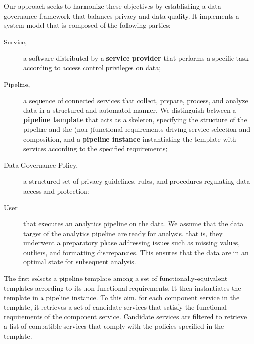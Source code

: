 Our approach seeks to harmonize these objectives by establishing a data governance framework that balances privacy and data quality. It implements a system model that is composed of the following parties:
\begin{description}
  \item[Service,] a software distributed by a \textbf{service provider} that performs a specific task according to access control privileges on data; %
  \item[Pipeline,] a sequence of connected services that collect, prepare, process, and analyze data in a structured and automated manner. We distinguish between a \textbf{pipeline template} that acts as a skeleton, specifying the structure of the pipeline and the (non-)functional requirements driving service selection and composition, and a \textbf{pipeline instance} instantiating the template with services according to the specified requirements;
  \item[Data Governance Policy,] a structured set of privacy guidelines, rules, and procedures regulating data access and protection;
  \item[User] that executes an analytics pipeline on the data. We assume that the data target of the analytics pipeline are ready for analysis, that is, they underwent a preparatory phase addressing issues such as missing values, outliers, and formatting discrepancies. This ensures that the data are in an optimal state for subsequent analysis.
\end{description}

The \user first selects a pipeline template among a set of functionally-equivalent templates according to its non-functional requirements. It then instantiates the template in a pipeline instance. To this aim, for each component service in the template, it retrieves a set of candidate services that satisfy the functional requirements of the component service. Candidate services are filtered to retrieve a list of compatible services that comply with the  policies specified in the template.


